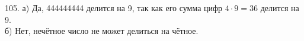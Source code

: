 105. а) Да, 444444444 делится на 9, так как его сумма цифр $4\cdot9=36$ делится на 9.\\
б) Нет, нечётное число не может делиться на чётное.\\

